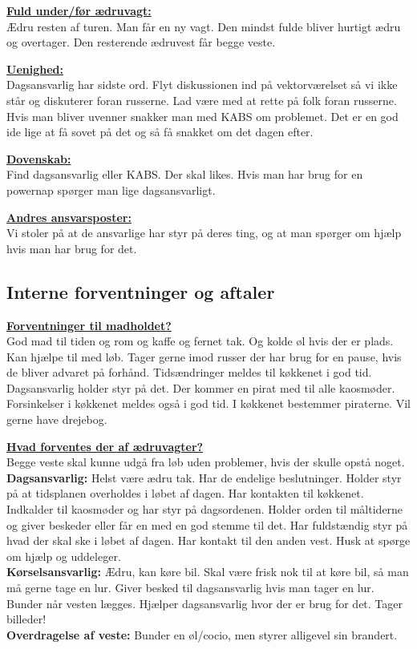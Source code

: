 \underline{\textbf{Fuld under/før ædruvagt:}}\\
Ædru resten af turen. Man får en ny vagt. Den mindst fulde bliver hurtigt ædru og overtager. Den resterende ædruvest får begge veste. 

\underline{\textbf{Uenighed:}}\\
Dagsansvarlig har sidste ord. Flyt diskussionen ind på vektorværelset så vi ikke står og diskuterer foran russerne. Lad være med at rette på folk foran russerne. Hvis man bliver uvenner snakker man med KABS om problemet. Det er en god ide lige at få sovet på det og så få snakket om det dagen efter. 

\underline{\textbf{Dovenskab:}}\\
Find dagsansvarlig eller KABS. Der skal likes. Hvis man har brug for en powernap spørger man lige dagsansvarligt.  

\underline{\textbf{Andres ansvarsposter:}}\\
Vi stoler på at de ansvarlige har styr på deres ting, og at man spørger om hjælp hvis man har brug for det. 

\subsection*{Interne forventninger og aftaler}
\underline{\textbf{Forventninger til madholdet?}}\\
God mad til tiden og rom og kaffe og fernet tak. Og kolde øl hvis der er plads. Kan hjælpe til med løb. Tager gerne imod russer der har brug for en pause, hvis de bliver advaret på forhånd. Tidsændringer meldes til køkkenet i god tid. Dagsansvarlig holder styr på det. Der kommer en pirat med til alle kaosmøder. Forsinkelser i køkkenet meldes også i god tid.  I køkkenet bestemmer piraterne. Vil gerne have drejebog.

\underline{\textbf{Hvad forventes der af ædruvagter?}}\\
Begge veste skal kunne udgå fra løb uden problemer, hvis der skulle opstå noget.\\
\textbf{Dagsansvarlig:} Helst være ædru tak. Har de endelige beslutninger. Holder styr på at tidsplanen overholdes i løbet af dagen. Har kontakten til køkkenet. Indkalder til kaosmøder og har styr på dagsordenen. Holder orden til måltiderne og giver beskeder eller får en med en god stemme til det. Har fuldstændig styr på hvad der skal ske i løbet af dagen. Har kontakt til den anden vest. Husk at spørge om hjælp og uddeleger.\\
\textbf{Kørselsansvarlig:} Ædru, kan køre bil. Skal være frisk nok til at køre bil, så man må gerne tage en lur. Giver besked til dagsansvarlig hvis man tager en lur. Bunder når vesten lægges. Hjælper dagsansvarlig hvor der er brug for det. Tager billeder!\\
\textbf{Overdragelse af veste:} Bunder en øl/cocio, men styrer alligevel sin brandert. 

